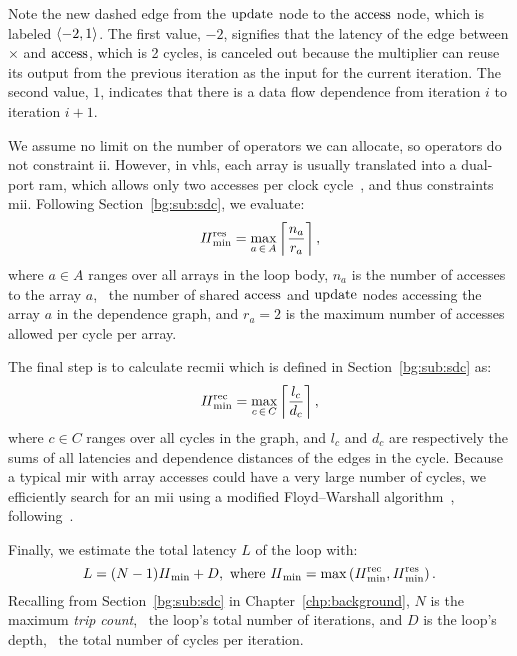 Note the new dashed edge from the $\operatorname{\mathrm{update}}$ node to the $\operatorname{\mathrm{access}}$ node,
which is labeled $\langle{-2},{1}\rangle$.  The first value, $-2$, signifies that the
latency of the edge between $\times$ and $\operatorname{\mathrm{access}}$, which is 2 cycles, is
canceled out because the multiplier can reuse its output from the previous
iteration as the input for the current iteration. The second value, $1$,
indicates that there is a data flow dependence from iteration $i$ to iteration
$i+1$.

We assume no limit on the number of operators we can allocate, so operators
do not constraint \gls{ii}.  However, in \gls{vhls}, each array is usually
translated into a dual-port \gls{ram}, which allows only two accesses per
clock cycle~\cite{vivado_hls}, and thus constraints \gls{mii}.  Following
Section~\ref{bg:sub:sdc}, we evaluate:
\begin{equation}
    \mathit{II}_{\rm min}^{\rm res} = \max_{a\,\in\,A} \left\lceil \frac{n_a}{r_a} \right\rceil,
\end{equation}
where $a \in A$ ranges over all arrays in the loop body, $n_a$ is the number of
accesses to the array $a$, \ie~the number of shared $\operatorname{\mathrm{access}}$ and $\operatorname{\mathrm{update}}$
nodes accessing the array $a$ in the dependence graph, and $r_a = 2$ is the
maximum number of accesses allowed per cycle per array.

The final step is to calculate \acrfull{recmii} which is defined in
Section~\ref{bg:sub:sdc} as:
\begin{equation}
    \mathit{II}_{\rm min}^{\rm rec} = \max_{c\,\in\,C} \left\lceil \frac{l_c}{d_c} \right\rceil,
\end{equation}
where $c \in C$ ranges over all cycles in the graph, and $l_c$ and $d_c$ are
respectively the sums of all latencies and dependence distances of the edges in
the cycle.  Because a typical \gls{mir} with array accesses could have a very
large number of cycles, we efficiently search for an \gls{mii} using a modified
Floyd--Warshall algorithm~\cite{floyd62}, following~\cite{rau94}.

Finally, we estimate the total latency $L$ of the loop with:
\begin{equation}
    L = (N - 1) \mathit{II}_{\rm min} + D,
    \text{~where~}
        \mathit{II}_{\rm min} = \max\left(\mathit{II}_{\rm min}^{\rm rec}, \mathit{II}_{\rm min}^{\rm res}\right).
    \nonumber
\end{equation}
Recalling from Section~\ref{bg:sub:sdc} in Chapter~\ref{chp:background}, $N$ is
the maximum \emph{trip count}, \ie~the loop's total number of iterations, and
$D$ is the loop's depth, \ie~the total number of cycles per iteration.

